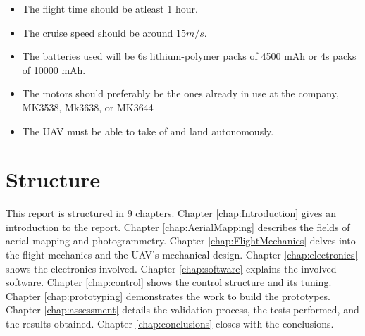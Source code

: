 \begin{itemize}

\item The flight time should be atleast 1 hour.
\item The cruise speed should be around $15 m/s$.
\item The batteries used will be 6s lithium-polymer packs of 4500 mAh or 4s packs of 10000 mAh.
\item The motors should preferably be the ones already in use at the company, MK3538, Mk3638, or MK3644
\item The UAV must be able to take of and land autonomously.

\end{itemize}


\section{Structure}
	
%
This report is structured in 9 chapters.
%
Chapter \ref{chap:Introduction} gives an introduction to the report.
%
Chapter \ref{chap:AerialMapping} describes the fields of aerial mapping and photogrammetry.
%
Chapter \ref{chap:FlightMechanics} delves into the flight mechanics and the UAV's mechanical design.
%
Chapter \ref{chap:electronics} shows the electronics involved.
%
Chapter \ref{chap:software} explains the involved software.
%
Chapter \ref{chap:control} shows the control structure and its tuning.
%
Chapter \ref{chap:prototyping} demonstrates the work to build the prototypes.
%
Chapter \ref{chap:assessment} details the validation process, the tests performed, and the results obtained.
%
Chapter \ref{chap:conclusions} closes with the conclusions.

